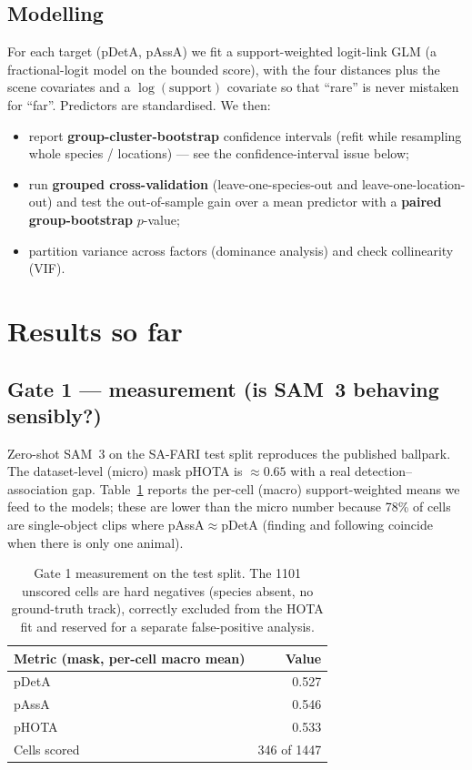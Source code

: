 \documentclass[11pt]{article}
\newcommand{\pdeta}{\textsf{pDetA}}
\newcommand{\passa}{\textsf{pAssA}}
\newcommand{\phota}{\textsf{pHOTA}}
\begin{document}
\subsection{Modelling}
For each target (\pdeta{}, \passa{}) we fit a support-weighted logit-link GLM (a fractional-logit model
on the bounded score), with the four distances plus the scene covariates and a $\log(\text{support})$
covariate so that ``rare'' is never mistaken for ``far''. Predictors are standardised. We then:
\begin{itemize}[leftmargin=1.4em,itemsep=1pt]
  \item report \textbf{group-cluster-bootstrap} confidence intervals (refit while resampling whole
        species / locations) --- see the confidence-interval issue below;
  \item run \textbf{grouped cross-validation} (leave-one-species-out and leave-one-location-out) and test
        the out-of-sample gain over a mean predictor with a \textbf{paired group-bootstrap} $p$-value;
  \item partition variance across factors (dominance analysis) and check collinearity (VIF).
\end{itemize}

\section{Results so far}

\subsection{Gate 1 --- measurement (is SAM~3 behaving sensibly?)}
Zero-shot SAM~3 on the SA-FARI test split reproduces the published ballpark. The dataset-level (micro)
mask \phota{} is $\approx 0.65$ with a real detection--association gap. Table~\ref{tab:gate1} reports the
per-cell (macro) support-weighted means we feed to the models; these are lower than the micro number
because 78\% of cells are single-object clips where \passa{}$\approx$\pdeta{} (finding and following
coincide when there is only one animal).

\begin{table}[h]
\centering
\begin{tabular}{lr}
\toprule
Metric (mask, per-cell macro mean) & Value \\
\midrule
\pdeta{} & 0.527 \\
\passa{} & 0.546 \\
\phota{} & 0.533 \\
\midrule
Cells scored & 346 of 1447 \\
\bottomrule
\end{tabular}
\caption{Gate 1 measurement on the test split. The 1101 unscored cells are hard negatives (species
absent, no ground-truth track), correctly excluded from the HOTA fit and reserved for a separate
false-positive analysis.}
\label{tab:gate1}
\end{table}
\end{document}
